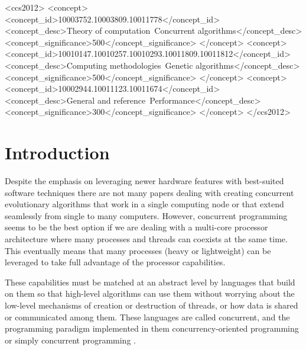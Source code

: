 \documentclass[sigconf]{acmart}\usepackage[]{graphicx}\usepackage[]{color}
\begin{document}
 \begin{CCSXML}
<ccs2012>
<concept>
<concept_id>10003752.10003809.10011778</concept_id>
<concept_desc>Theory of computation~Concurrent algorithms</concept_desc>
<concept_significance>500</concept_significance>
</concept>
<concept>
<concept_id>10010147.10010257.10010293.10011809.10011812</concept_id>
<concept_desc>Computing methodologies~Genetic algorithms</concept_desc>
<concept_significance>500</concept_significance>
</concept>
<concept>
<concept_id>10002944.10011123.10011674</concept_id>
<concept_desc>General and reference~Performance</concept_desc>
<concept_significance>300</concept_significance>
</concept>
</ccs2012>

\end{CCSXML}




\maketitle

\section{Introduction}

Despite the emphasis on leveraging newer hardware features
with best-suited software techniques
 there are not many papers \cite{Xia2010} dealing with 
creating concurrent evolutionary algorithms that work in a single
computing node or that extend seamlessly from single to many
computers. However, concurrent programming seems to be the best 
option if we are dealing with a multi-core processor architecture 
where many processes and threads can coexists at the same time. 
 This eventually means that many
processes (heavy or lightweight) can be leveraged to take full
advantage of the processor capabilities.

These capabilities must be matched at an abstract level by languages
that build on them so that high-level algorithms can use them without
worrying about the low-level mechanisms of creation or destruction of
threads, or how data is shared or communicated among them. These
languages are called concurrent, and the programming paradigm
implemented in them concurrency-oriented programming or simply
concurrent programming \cite{Armstrong2003}. 
\end{document}
